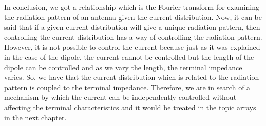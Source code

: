 In conclusion, we got a relationship which is the Fourier transform for examining the radiation pattern of an antenna given the current distribution. Now, it can be said that if a given current distribution will give a unique radiation pattern, then controlling the current distribution has a way of controlling the radiation pattern. However, it is not possible to control the current because just as it was explained in the case of the dipole, the current cannot be controlled but the length of the dipole can be controlled and as we vary the length, the terminal impedance varies. So, we have that the current distribution which is related to the radiation pattern is coupled to the terminal impedance. Therefore, we are in search of a mechanism by which the current can be independently controlled without affecting the terminal characteristics and it would be treated in the topic arrays in the next chapter.
